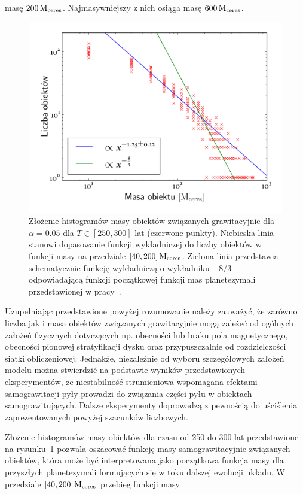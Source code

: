masę $200\hbox{$\mathrm{\thinspace M_{\textrm{ceres}}}$}$.  Najmasywniejszy z nich osiąga masę $600\hbox{$\mathrm{\thinspace M_{\textrm{ceres}}}$}$.
%
\begin{figure}[ht]
   \centering
   \includegraphics[width=0.7\linewidth]{figures/mass_func}
   \caption[Złożenie histogramów masy obiektów związanych grawitacyjnie dla
   $\alpha = 0.05$.]
   {Złożenie histogramów masy obiektów związanych grawitacyjnie dla
   $\alpha = 0.05$ dla $T \in [250, 300]$ lat (czerwone punkty). Niebieska linia
stanowi dopasowanie funkcji wykładniczej do liczby obiektów w funkcji masy na
przedziale $[40,200]\hbox{$\mathrm{\thinspace M_{\textrm{ceres}}}$}$. Zielona linia przedstawia schematycznie funkcję
wykładniczą o wykładniku $-8/3$ odpowiadającą funkcji początkowej funkcji mas
planetezymali przedstawionej w pracy~\cite{MFFK98}.}
   \label{fig:massfun}
\end{figure}
\par Uzupełniając przedstawione powyżej rozumowanie należy zauważyć, że zarówno liczba
jak i masa obiektów związanych grawitacyjnie mogą zależeć od ogólnych założeń
fizycznych dotyczących np. obecności lub braku pola magnetycznego, obecności
pionowej stratyfikacji dysku oraz przypuszczalnie od rozdzielczości siatki
obliczeniowej. Jednakże, niezależnie od wyboru szczegółowych założeń
modelu można stwierdzić na podstawie wyników przedstawionych eksperymentów, że
niestabilność strumieniowa wspomagana efektami samograwitacji pyły prowadzi do
związania części pyłu w obiektach samograwitujących. Dalsze eksperymenty
doprowadzą z pewnością do uściślenia zaprezentowanych powyżej szacunków
liczbowych.
%
\par Złożenie histogramów masy obiektów dla czasu od 250 do 300 lat
przedstawione na rysunku~\ref{fig:massfun} pozwala oszacować funkcję masy
samograwitacyjnie związanych obiektów, która może być interpretowana jako
początkowa funkcja masy dla przyszłych planetezymali formujących się w toku
dalszej ewolucji układu. W przedziale $[40, 200]\hbox{$\mathrm{\thinspace M_{\textrm{ceres}}}$}$ przebieg funkcji masy
